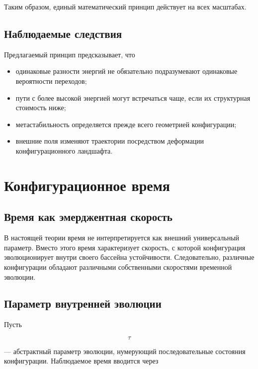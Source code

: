 Таким образом, единый математический принцип действует на всех масштабах.

\section{Наблюдаемые следствия}

Предлагаемый принцип предсказывает, что

\begin{itemize}

\item одинаковые разности энергий
не обязательно подразумевают одинаковые вероятности переходов;

\item пути с более высокой энергией
могут встречаться чаще,
если их структурная стоимость ниже;

\item метастабильность
определяется прежде всего
геометрией конфигурации;

\item внешние поля
изменяют траектории
посредством деформации
конфигурационного ландшафта.

\end{itemize}

\chapter{Конфигурационное время}

\section{Время как эмерджентная скорость}

В настоящей теории время не интерпретируется как внешний универсальный параметр. Вместо этого время характеризует скорость, с которой конфигурация эволюционирует внутри своего бассейна устойчивости. Следовательно, различные конфигурации обладают различными собственными скоростями временной эволюции.

\section{Параметр внутренней эволюции}

Пусть

\[ \tau \]

— абстрактный параметр эволюции, нумерующий последовательные состояния конфигурации. Наблюдаемое время вводится через

